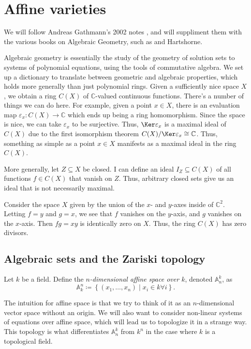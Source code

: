 \chapter{Affine varieties}


We will follow Andreas Gathmann's 2002 notes \cite{Gathmann2002}, and will suppliment them with the various books on Algebraic Geometry, such as \cite{vakil} and Hartshorne.

Algebraic geometry is essentially the study of the geometry of solution sets to systems of polynomial equations, using the tools of commutative algebra. We set up a dictionary to translate between geometric and algebraic properties, which holds more generally than just polynomial rings. Given a sufficiently nice space $X$, we obtain a ring $C(X)$ of $\mathbb{C} $-valued continuous functions. There's a number of things we can do here. For example, given a point $x\in X$, there is an evaluation map $\varepsilon _x : C(X) \to \mathbb{C} $ which ends up being a ring homomorphism. Since the space is nice, we can take $\varepsilon _x$ to be surjective. Thus, $\Ker \varepsilon _x$ is a maximal ideal of $C(X)$ due to the first isomorphism theorem $C(X) / \Ker \varepsilon _x \cong \mathbb{C} $. Thus, something as simple as a point $x\in X$ manifests as a maximal ideal in the ring $C(X)$.

More generally, let $Z\subseteq X$ be closed. I can define an ideal $I_Z \subseteq C(X)$ of all functions $f\in C(X)$ that vanish on $Z$. Thus, arbitrary closed sets give us an ideal that is not necessarily maximal.

Consider the space $X$ given by the union of the $x$- and $y$-axes inside of $\mathbb{C} ^2$. Letting $f=y$ and $g=x$, we see that $f$ vanishes on the $y$-axis, and $g$ vanishes on the $x$-axis. Then $fg=xy$ is identically zero on $X$. Thus, the ring $C(X)$ has zero divisors.

\section{Algebraic sets and the Zariski topology}

\begin{definition}\label{dfn:1.1.1}
	Let $k$ be a field. Define the \emph{$n$-dimensional affine space over $k$}, denoted $\mathbb{A} _n^k$, as
	\[
		\mathbb{A}^n_k \coloneqq \left\{ (x_1, \ldots ,x_n)\mid x_i\in k \forall i \right\} 
	.\]
\end{definition}
The intuition for affine space is that we try to think of it as an $n$-dimensional vector space without an origin. We will also want to consider non-linear systems of equations over affine space, which will lead us to topologize it in a strange way. This topology is what differentiates $\mathbb{A} _n^k$ from $k^n$ in the case where $k$ is a topological field.

